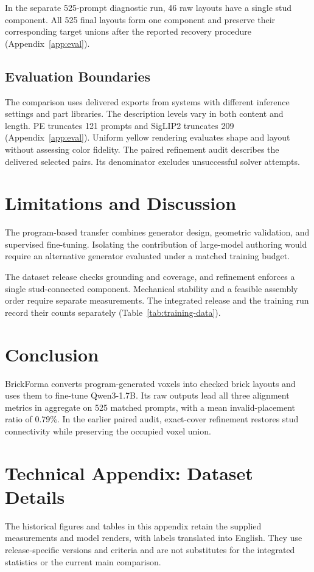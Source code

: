 \documentclass[letterpaper]{article} %
\begin{document}
In the separate 525-prompt diagnostic run, 46 raw layouts have a single stud component. All 525 final layouts form one component and preserve their corresponding target unions after the reported recovery procedure (Appendix~\ref{app:eval}).

\subsection{Evaluation Boundaries}
The comparison uses delivered exports from systems with different inference settings and part libraries. The description levels vary in both content and length. PE truncates 121 prompts and SigLIP2 truncates 209 (Appendix~\ref{app:eval}). Uniform yellow rendering evaluates shape and layout without assessing color fidelity. The paired refinement audit describes the delivered selected pairs. Its denominator excludes unsuccessful solver attempts.


\section{Limitations and Discussion}
The program-based transfer combines generator design, geometric validation, and supervised fine-tuning. Isolating the contribution of large-model authoring would require an alternative generator evaluated under a matched training budget.

The dataset release checks grounding and coverage, and refinement enforces a single stud-connected component. Mechanical stability and a feasible assembly order require separate measurements. The integrated release and the training run record their counts separately (Table~\ref{tab:training-data}).

\section{Conclusion}
BrickForma converts program-generated voxels into checked brick layouts and uses them to fine-tune Qwen3-1.7B. Its raw outputs lead all three alignment metrics in aggregate on 525 matched prompts, with a mean invalid-placement ratio of 0.79\%. In the earlier paired audit, exact-cover refinement restores stud connectivity while preserving the occupied voxel union.


\FloatBarrier
\appendix
\section{Technical Appendix: Dataset Details}
\label{app:dataset}
The historical figures and tables in this appendix retain the supplied measurements and model renders, with labels translated into English. They use release-specific versions and criteria and are not substitutes for the integrated statistics or the current main comparison.
\end{document}
